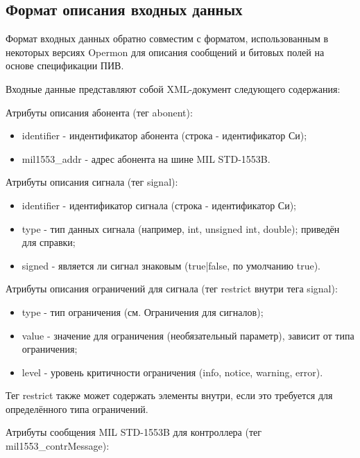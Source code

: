 \subsection{Формат описания входных данных}

Формат входных данных обратно совместим с форматом, использованным в некоторых 
версиях Opermon для описания сообщений и битовых полей на основе спецификации 
ПИВ.

Входные данные представляют собой XML-документ следующего содержания: 



Атрибуты описания абонента (тег abonent):

\begin{itemize}
 \item identifier - индентификатор абонента (строка - идентификатор Си);
 \item mil1553\_addr - адрес абонента на шине MIL STD-1553B.
\end{itemize}

Атрибуты описания сигнала (тег signal):

\begin{itemize}
 \item identifier - идентификатор сигнала (строка - идентификатор Си);
 \item type - тип данных сигнала (например, int, unsigned int, double); 
приведён для справки;
 \item signed - является ли сигнал знаковым (true|false, по умолчанию true).
\end{itemize}

Атрибуты описания ограничений для сигнала (тег restrict внутри тега signal):

\begin{itemize}
 \item type - тип ограничения (см. Ограничения для сигналов); %
 \item value - значение для ограничения (необязательный параметр), зависит от 
типа ограничения;
 \item level - уровень критичности ограничения (info, notice, warning, error).
\end{itemize}

Тег restrict также может содержать элементы внутри, если это требуется для 
определённого типа ограничений.

Атрибуты сообщения MIL STD-1553B для контроллера (тег mil1553\_contrMessage):

